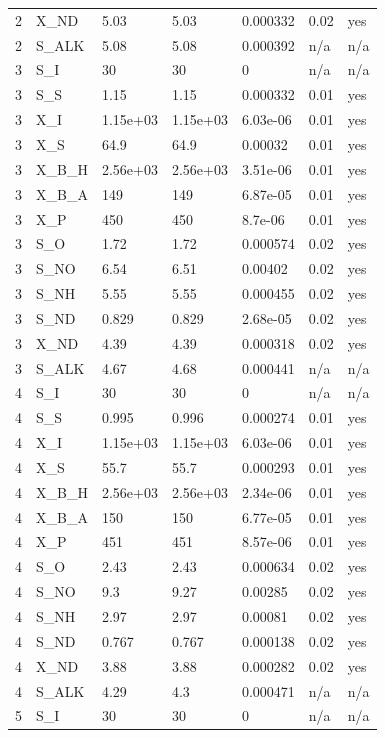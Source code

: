 \begin{table}[t]
\begin{tabular}{lllllll}
2 & X\_ND & 5.03 & 5.03 & 0.000332 & 0.02 & yes \\
2 & S\_ALK & 5.08 & 5.08 & 0.000392 & n/a & n/a \\
3 & S\_I & 30 & 30 & 0 & n/a & n/a \\
3 & S\_S & 1.15 & 1.15 & 0.000332 & 0.01 & yes \\
3 & X\_I & 1.15e+03 & 1.15e+03 & 6.03e-06 & 0.01 & yes \\
3 & X\_S & 64.9 & 64.9 & 0.00032 & 0.01 & yes \\
3 & X\_B\_H & 2.56e+03 & 2.56e+03 & 3.51e-06 & 0.01 & yes \\
3 & X\_B\_A & 149 & 149 & 6.87e-05 & 0.01 & yes \\
3 & X\_P & 450 & 450 & 8.7e-06 & 0.01 & yes \\
3 & S\_O & 1.72 & 1.72 & 0.000574 & 0.02 & yes \\
3 & S\_NO & 6.54 & 6.51 & 0.00402 & 0.02 & yes \\
3 & S\_NH & 5.55 & 5.55 & 0.000455 & 0.02 & yes \\
3 & S\_ND & 0.829 & 0.829 & 2.68e-05 & 0.02 & yes \\
3 & X\_ND & 4.39 & 4.39 & 0.000318 & 0.02 & yes \\
3 & S\_ALK & 4.67 & 4.68 & 0.000441 & n/a & n/a \\
4 & S\_I & 30 & 30 & 0 & n/a & n/a \\
4 & S\_S & 0.995 & 0.996 & 0.000274 & 0.01 & yes \\
4 & X\_I & 1.15e+03 & 1.15e+03 & 6.03e-06 & 0.01 & yes \\
4 & X\_S & 55.7 & 55.7 & 0.000293 & 0.01 & yes \\
4 & X\_B\_H & 2.56e+03 & 2.56e+03 & 2.34e-06 & 0.01 & yes \\
4 & X\_B\_A & 150 & 150 & 6.77e-05 & 0.01 & yes \\
4 & X\_P & 451 & 451 & 8.57e-06 & 0.01 & yes \\
4 & S\_O & 2.43 & 2.43 & 0.000634 & 0.02 & yes \\
4 & S\_NO & 9.3 & 9.27 & 0.00285 & 0.02 & yes \\
4 & S\_NH & 2.97 & 2.97 & 0.00081 & 0.02 & yes \\
4 & S\_ND & 0.767 & 0.767 & 0.000138 & 0.02 & yes \\
4 & X\_ND & 3.88 & 3.88 & 0.000282 & 0.02 & yes \\
4 & S\_ALK & 4.29 & 4.3 & 0.000471 & n/a & n/a \\
5 & S\_I & 30 & 30 & 0 & n/a & n/a \\

\end{tabular}
\end{table}
